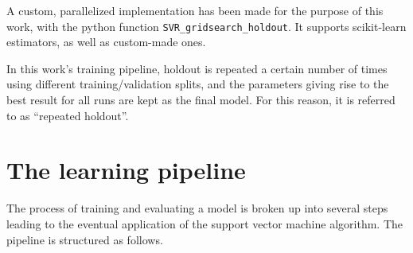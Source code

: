 \documentclass[12pt]{report}
\begin{document}
A custom, parallelized implementation has been made for the purpose of this work, with the python function \texttt{SVR\_gridsearch\_holdout}. It supports scikit-learn estimators, as well as custom-made ones.

In this work's training pipeline, holdout is repeated a certain number of times using different training/validation splits, and the parameters giving rise to the best result for all runs are kept as the final model. For this reason, it is referred to as ``repeated holdout''.

\section{The learning pipeline} \label{learnpipeline}
The process of training and evaluating a model is broken up into several steps leading to the eventual application of the support vector machine algorithm. The pipeline is structured as follows.
\end{document}
